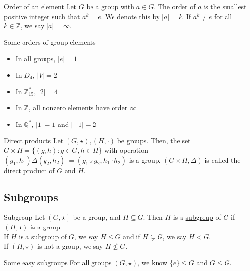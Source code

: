 \documentclass[12pt]{article}
\newcommand{\Z}{\mathbb{Z}}
\newcommand{\Q}{\mathbb{Q}}
\begin{document}
	\begin{mydef}{Order of an element}{}
		Let $G$ be a group with $a\in G$. The \underline{order} of $a$ is the smallest positive integer such that $a^k=e$. We denote this by $|a|=k$. If $a^k\neq e$ for all $k\in\Z$, we say $|a|=\infty$.
	\end{mydef}
	
	\begin{myex}{Some orders of group elements}{}
		\begin{itemize}
			\item In all groups, $|e|=1$\\
			\item In $D_4$, $|V|=2$\\
			\item In $\Z_{15}^*$, $|2|=4$\\
			\item In $\Z$, all nonzero elements have order $\infty$\\
			\item In $\Q^*$, $|1|=1$ and $|-1|=2$
		\end{itemize}			
	\end{myex}
	
	\begin{mydef}{Direct products}{}
		Let $(G, \star), (H, \cdot)$ be groups. Then, the set $G\times H=\{(g, h):g\in G, h\in H\}$ with operation $(g_1, h_1)\Delta(g_2, h_2):=(g_1\star g_2, h_1\cdot h_2)$ is a group. $(G\times H, \Delta)$ is called the \underline{direct product} of $G$ and $H$.
	\end{mydef}
	
	\subsection{Subgroups}
	\begin{mydef}{Subgroup}{}
		Let $(G, \star)$ be a group, and $H\subseteq G$. Then $H$ is a \underline{subgroup} of $G$ if $(H, \star)$ is a group.\\
		
		If $H$ is a subgroup of $G$, we say $H\leq G$ and if $H\subsetneq G$, we say $H<G$.\\
		
		If 	$(H, \star)$ is not a group, we say $H\nleq G$.
	\end{mydef}
	
	\begin{myex}{Some easy subgroups}{}
		For all groups $(G, \star)$, we know $\{e\}\leq G$ and $G\leq G$.
	\end{myex}
	
\end{document}
